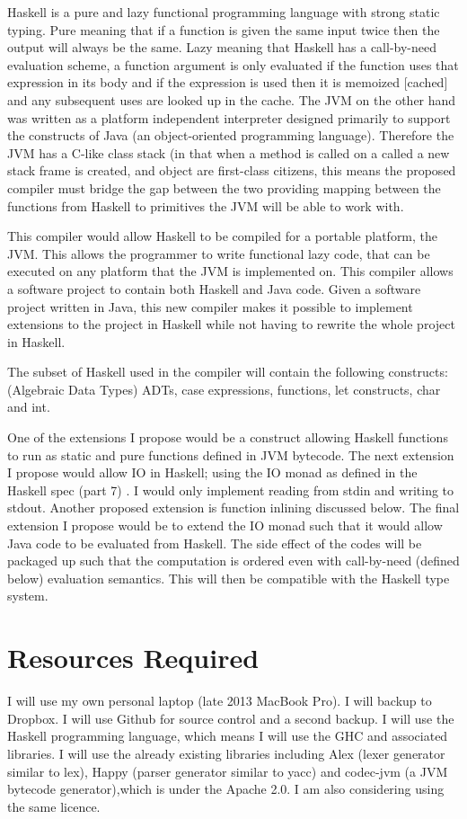 \documentclass[a4paper]{article}
\begin{document}
  Haskell is a pure and lazy functional programming language with strong static typing. Pure meaning that
  if a function is given the same input twice then the output will always be the same. Lazy meaning that Haskell has a
  call-by-need evaluation scheme, a function argument is only evaluated if the function uses that expression in its body
  and if the expression is used then it is memoized [cached] and any subsequent uses are looked up in the cache.
  The JVM on the other hand was  written as a platform independent interpreter designed
  primarily to support the constructs of Java (an object-oriented programming language).
  Therefore the JVM has a C-like class stack (in that when a method is called on a called a new stack frame is created, and object are first-class citizens, this means
  the proposed compiler must bridge the gap between the two providing mapping between the functions from Haskell to primitives
  the JVM will be able to work with.

  This compiler would allow Haskell to be compiled for a portable platform, the JVM. This allows the programmer to
  write functional lazy code, that can be executed on any platform that the JVM is implemented on. This compiler allows a software project to contain both
  Haskell and Java code. Given a software project written in Java, this new compiler makes it possible to implement extensions to the project in Haskell
  while not having to rewrite the whole project in Haskell.

  The subset of Haskell used in the compiler will contain the following constructs: (Algebraic Data Types) ADTs, case expressions,
  functions, let constructs, char and int.

  One of the extensions I propose would be a construct allowing Haskell functions to run as static and pure functions defined in JVM bytecode.
  The next extension I propose would allow IO in Haskell; using the IO monad as defined in the Haskell spec (part 7) \cite{haskell98-spec}. 
  I would only implement reading from stdin and writing to stdout. Another proposed extension is function inlining discussed below.
  The final extension I propose would be to extend the IO monad such that it would allow Java code to be evaluated from Haskell. The side effect of the codes
  will be packaged  up such that the computation is ordered even with call-by-need (defined below) evaluation semantics.
  This will then be compatible with the Haskell type system.

\section*{Resources Required}
  I will use my own personal laptop (late 2013 MacBook Pro).
  I will backup to Dropbox.
  I will use Github for source control and a second backup.
  I will use the Haskell programming language, which means I will use the GHC and associated libraries.
  I will use the already existing libraries including Alex (lexer generator similar to lex),
  Happy (parser generator similar to yacc) and codec-jvm (a JVM bytecode generator),which is under the Apache 2.0. I am also considering using the same licence.
\end{document}
